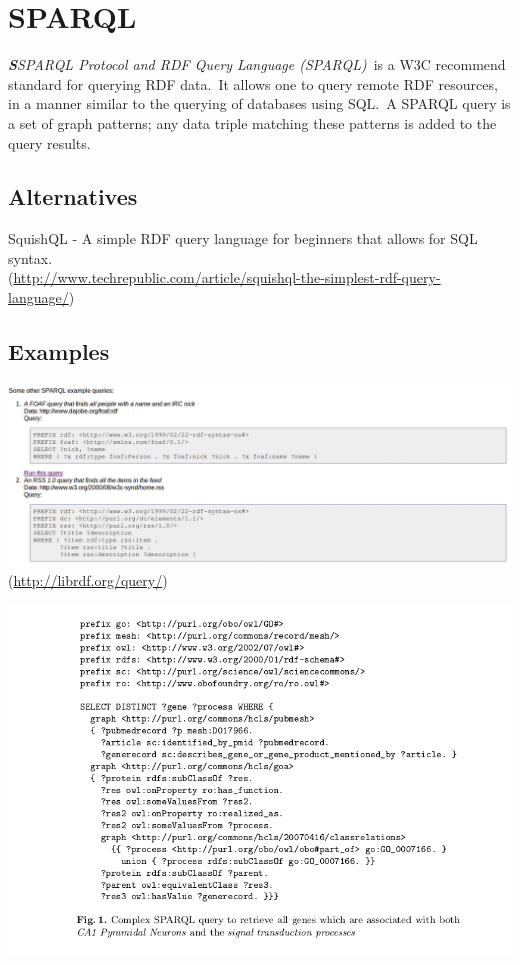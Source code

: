 \documentclass[DIV=calc, paper=a4, fontsize=12pt, onecolumn]{scrartcl}	 %
\newcommand{\initial}[1]{ %
\lettrine[lines=3,lhang=0.3,nindent=0em,slope=0em]{
\color{DarkBlue}
{\textbf{\textit{#1}}}}{}}
\begin{document}

\section[SPARQL Protocol and RDF Query Language (SPARQL)]{SPARQL}
  \label{sec:sparql}

\initial{S}\textit{SPARQL Protocol and RDF Query Language (SPARQL)}\
		is a W3C recommend standard for querying RDF data.\
		It allows one to query remote RDF resources, in a manner similar to the querying of databases using SQL.\
		A SPARQL query is a set of graph patterns; any data triple matching these patterns is added to the query results.\
                   \cite{Jarrar_mashql:_2008}     
		
		\subsection{Alternatives}

		SquishQL - A simple RDF query language for beginners that allows for SQL syntax.\\
		(\url{http://www.techrepublic.com/article/squishql-the-simplest-rdf-query-language/})\

		\subsection{Examples}

                  \includegraphics[scale=0.5]{sparql.png}\\
		 (\url{http://librdf.org/query/})

  		   \includegraphics[scale=0.5]{sparql1.png}
 		  \cite{stenzhorn2008simplifying}\\
\end{document}
